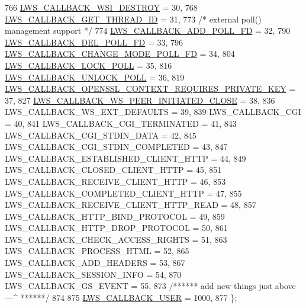 \begin{DoxyCode}
766         \hyperlink{group__usercb_ggad62860e19975ba4c4af401c3cdb6abf7aca834dc035b7f7486f9ce40fde54fe9e}{LWS\_CALLBACK\_WSI\_DESTROY}                                = 30,
768         \hyperlink{group__usercb_ggad62860e19975ba4c4af401c3cdb6abf7adfb41c92e2522712207ef7f2462b5e34}{LWS\_CALLBACK\_GET\_THREAD\_ID}                            = 31,
773         \textcolor{comment}{/* external poll() management support */}
774         \hyperlink{group__usercb_ggad62860e19975ba4c4af401c3cdb6abf7ab69783a9fbf2ca71ad70706bda77b412}{LWS\_CALLBACK\_ADD\_POLL\_FD}                                = 32,
790         \hyperlink{group__usercb_ggad62860e19975ba4c4af401c3cdb6abf7a1df60f314710236f9b53efbf468da768}{LWS\_CALLBACK\_DEL\_POLL\_FD}                                = 33,
796         \hyperlink{group__usercb_ggad62860e19975ba4c4af401c3cdb6abf7aa87d2e82fffa42c3680c7403ef94216e}{LWS\_CALLBACK\_CHANGE\_MODE\_POLL\_FD}                        = 34,
804         \hyperlink{group__usercb_ggad62860e19975ba4c4af401c3cdb6abf7a8909732521d379179003d97ab7a05428}{LWS\_CALLBACK\_LOCK\_POLL}                                    = 35,
816         \hyperlink{group__usercb_ggad62860e19975ba4c4af401c3cdb6abf7a0e9e3dd667c0c42cdbe1a3d921f4fd79}{LWS\_CALLBACK\_UNLOCK\_POLL}                                = 36,
819         \hyperlink{group__usercb_ggad62860e19975ba4c4af401c3cdb6abf7aa46f705dcf97502e95627ffde614f98b}{LWS\_CALLBACK\_OPENSSL\_CONTEXT\_REQUIRES\_PRIVATE\_KEY}      
      = 37,
827         \hyperlink{group__usercb_ggad62860e19975ba4c4af401c3cdb6abf7ac3fc5bbb55e69f90396526287ee84a51}{LWS\_CALLBACK\_WS\_PEER\_INITIATED\_CLOSE}                        = 
      38,
836         LWS\_CALLBACK\_WS\_EXT\_DEFAULTS                            = 39,
839         LWS\_CALLBACK\_CGI                                        = 40,
841         LWS\_CALLBACK\_CGI\_TERMINATED                             = 41,
843         LWS\_CALLBACK\_CGI\_STDIN\_DATA                             = 42,
845         LWS\_CALLBACK\_CGI\_STDIN\_COMPLETED                        = 43,
847         LWS\_CALLBACK\_ESTABLISHED\_CLIENT\_HTTP                    = 44,
849         LWS\_CALLBACK\_CLOSED\_CLIENT\_HTTP                         = 45,
851         LWS\_CALLBACK\_RECEIVE\_CLIENT\_HTTP                        = 46,
853         LWS\_CALLBACK\_COMPLETED\_CLIENT\_HTTP                      = 47,
855         LWS\_CALLBACK\_RECEIVE\_CLIENT\_HTTP\_READ                   = 48,
857         LWS\_CALLBACK\_HTTP\_BIND\_PROTOCOL                         = 49,
859         LWS\_CALLBACK\_HTTP\_DROP\_PROTOCOL                         = 50,
861         LWS\_CALLBACK\_CHECK\_ACCESS\_RIGHTS                        = 51,
863         LWS\_CALLBACK\_PROCESS\_HTML                               = 52,
865         LWS\_CALLBACK\_ADD\_HEADERS                                = 53,
867         LWS\_CALLBACK\_SESSION\_INFO                               = 54,
870         LWS\_CALLBACK\_GS\_EVENT                                   = 55,
873         \textcolor{comment}{/****** add new things just above ---^ ******/}
874 
875         \hyperlink{group__usercb_ggad62860e19975ba4c4af401c3cdb6abf7a982579753e70e59a9ea13ce628ac891a}{LWS\_CALLBACK\_USER} = 1000,
877 \};
\end{DoxyCode}
